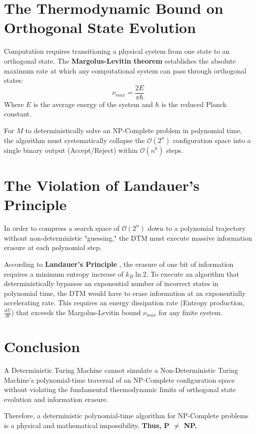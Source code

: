 \documentclass[12pt]{article}
\begin{document}
\section{The Thermodynamic Bound on Orthogonal State Evolution}
Computation requires transitioning a physical system from one state to an orthogonal state. The \textbf{Margolus-Levitin theorem} \cite{margolus} establishes the absolute maximum rate at which any computational system can pass through orthogonal states:
$$ \nu_{max} = \frac{2E}{\pi \hbar} $$
Where $E$ is the average energy of the system and $\hbar$ is the reduced Planck constant. 

For $M$ to deterministically solve an NP-Complete problem in polynomial time, the algorithm must systematically collapse the $\mathcal{O}(2^n)$ configuration space into a single binary output (Accept/Reject) within $\mathcal{O}(n^k)$ steps. 

\section{The Violation of Landauer's Principle}
In order to compress a search space of $\mathcal{O}(2^n)$ down to a polynomial trajectory without non-deterministic "guessing," the DTM must execute massive information erasure at each polynomial step. 

According to \textbf{Landauer's Principle} \cite{landauer}, the erasure of one bit of information requires a minimum entropy increase of $k_B \ln 2$. 
To execute an algorithm that deterministically bypasses an exponential number of incorrect states in polynomial time, the DTM would have to erase information at an exponentially accelerating rate. 
This requires an energy dissipation rate (Entropy production, $\frac{d\Sigma}{dt}$) that exceeds the Margolus-Levitin bound $\nu_{max}$ for any finite system.

\section{Conclusion}
A Deterministic Turing Machine cannot simulate a Non-Deterministic Turing Machine's polynomial-time traversal of an NP-Complete configuration space without violating the fundamental thermodynamic limits of orthogonal state evolution and information erasure. 

Therefore, a deterministic polynomial-time algorithm for NP-Complete problems is a physical and mathematical impossibility.
\textbf{Thus, P $\neq$ NP.}
\end{document}

